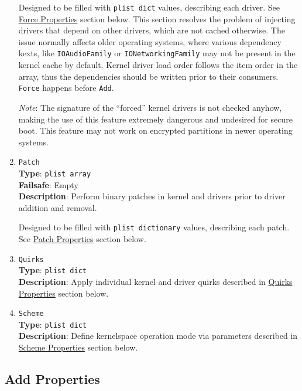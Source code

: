 \documentclass[]{article}
\makeatletter
\renewcommand{\label}[1]{%
\zref@wrapper@immediate{\oldlabel{#1}}}  %
\makeatother
\begin{document}
\begin{enumerate}
  Designed to be filled with \texttt{plist\ dict} values, describing each driver.
  See \hyperref[kernelpropsforce]{Force Properties} section below.
  This section resolves the problem of injecting drivers that depend on other
  drivers, which are not cached otherwise. The issue normally affects older
  operating systems, where various dependency kexts, like \texttt{IOAudioFamily}
  or \texttt{IONetworkingFamily} may not be present in the kernel cache by default.
  Kernel driver load order follows the item order in the array, thus the dependencies
  should be written prior to their consumers. \texttt{Force} happens before
  \texttt{Add}.

  \emph{Note}: The signature of the ``forced'' kernel drivers is not checked anyhow,
  making the use of this feature extremely dangerous and undesired for secure boot.
  This feature may not work on encrypted partitions in newer operating systems.

\item
  \texttt{Patch}\\
  \textbf{Type}: \texttt{plist\ array}\\
  \textbf{Failsafe}: Empty\\
  \textbf{Description}: Perform binary patches in kernel and drivers prior to
  driver addition and removal.

  Designed to be filled with \texttt{plist\ dictionary} values, describing each
  patch. See \hyperref[kernelpropspatch]{Patch Properties} section below.

\item
  \texttt{Quirks}\\
  \textbf{Type}: \texttt{plist\ dict}\\
  \textbf{Description}: Apply individual kernel and driver quirks described
  in \hyperref[kernelpropsquirks]{Quirks Properties} section below.

\item
  \texttt{Scheme}\\
  \textbf{Type}: \texttt{plist\ dict}\\
  \textbf{Description}: Define kernelspace operation mode via parameters
  described in \hyperref[kernelpropsscheme]{Scheme Properties} section below.


\end{enumerate}

\subsection{Add Properties}\label{kernelpropsadd}
\end{document}
